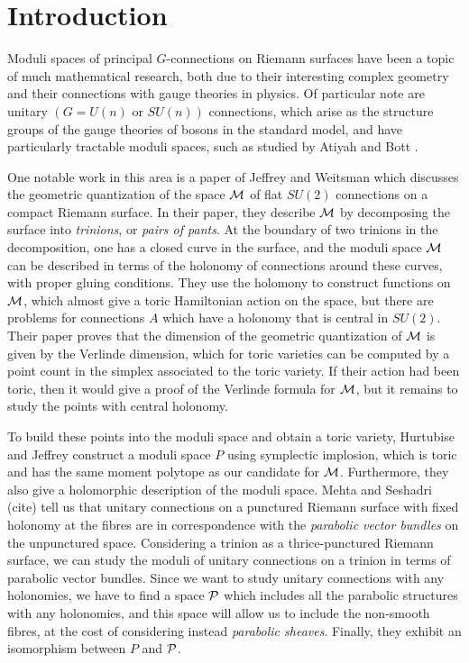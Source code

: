 \section{Introduction}
\label{s:intro}

	Moduli spaces of principal $G$-connections on Riemann surfaces have been a topic of much mathematical research, both due to their interesting complex geometry and their connections with gauge theories in physics. Of particular note are unitary $(G=U(n) \text{ or }SU(n))$ connections, which arise as the structure groups of the gauge theories of bosons in the standard model, and have particularly tractable moduli spaces, such as studied by Atiyah and Bott \cite{atiyah_yang-mills_1983}. 
	
	One notable work in this area is a paper of Jeffrey and Weitsman \cite{jeffrey_bohr-sommerfeld_1992} which discusses the geometric quantization of the space $\mathcal{M}$ of flat $SU(2)$ connections on a compact Riemann surface. In their paper, they describe $\mathcal{M}$ by decomposing the surface into \textit{trinions}, or \textit{pairs of pants}. At the boundary of two trinions in the decomposition, one has a closed curve in the surface, and the moduli space $\mathcal{M}$ can be described in terms of the holonomy of connections around these curves, with proper gluing conditions. They use the holomony to construct functions on $\mathcal{M}$, which almost give a toric Hamiltonian action on the space, but there are problems for connections $A$ which have a holonomy that is central in $SU(2)$. Their paper proves that the dimension of the geometric quantization of $\mathcal{M}$ is given by the Verlinde dimension, which for toric varieties can be computed by a point count in the simplex associated to the toric variety. If their action had been toric, then it would give a proof of the Verlinde formula for $\mathcal{M}$, but it remains to study the points with central holonomy.
	
	To build these points into the moduli space and obtain a toric variety, Hurtubise and Jeffrey \cite{hurtubise_moduli_2005}\cite{hurtubise_representations_2000} construct a moduli space $P$ using symplectic implosion, which is toric and has the same moment polytope as our candidate for $\mathcal{M}$. Furthermore, they also give a holomorphic description of the moduli space. Mehta and Seshadri (cite) tell us that unitary connections on a punctured Riemann surface with fixed holonomy at the fibres are in correspondence with the \textit{parabolic vector bundles} on the unpunctured space. Considering a trinion as a thrice-punctured Riemann surface, we can study the moduli of unitary connections on a trinion in terms of parabolic vector bundles. Since we want to study unitary connections with any holonomies, we have to find a space $\mathcal{P}$ which includes all the parabolic structures with any holonomies, and this space will allow us to include the non-smooth fibres, at the cost of considering instead \emph{parabolic sheaves}. Finally, they exhibit an isomorphism between $P$ and $\mathcal{P}$.
	

